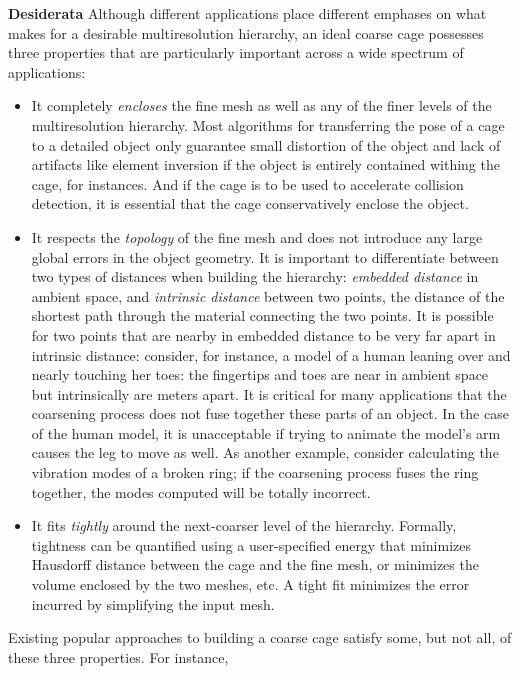 \noindent \textbf{Desiderata} Although different applications place different
emphases on what makes for a desirable multiresolution hierarchy, an ideal
coarse cage possesses three properties that are particularly important across a
wide spectrum of applications:
\begin{itemize}
\item It completely \emph{encloses} the fine mesh as well as any of the finer
levels of the multiresolution hierarchy. Most algorithms for transferring the
pose of a cage to a detailed object only guarantee small distortion of the
object and lack of artifacts like element inversion if the object is entirely
contained withing the cage, for instances. And if the cage is to be used to
accelerate collision detection, it is essential that the cage conservatively
enclose the object. 
\item It respects the \emph{topology} of the fine mesh and does not introduce
any large global errors in the object geometry. It is important to
differentiate between two types of distances when building the hierarchy:
\emph{embedded distance} in ambient space, and \emph{intrinsic distance}
between two points, the distance of the shortest path through the material
connecting the two points. It is possible for two points that are nearby in
embedded distance to be very far apart in intrinsic distance: consider, for
instance, a model of a human leaning over and nearly touching her toes: the
fingertips and toes are near in ambient space but intrinsically are meters
apart. It is critical for many applications that the coarsening process does
not fuse together these parts of an object. In the case of the human model, it
is unacceptable if trying to animate the model's arm causes the leg to move as
well. As another example, consider calculating the vibration modes of a broken
ring; if the coarsening process fuses the ring together, the modes computed
will be totally incorrect.
\item It fits \emph{tightly} around the next-coarser level of the hierarchy.
Formally, tightness can be quantified using a user-specified energy that
minimizes Hausdorff distance between the cage and the fine mesh, or minimizes
the volume enclosed by the two meshes, etc. A tight fit minimizes the error
incurred by simplifying the input mesh.
\end{itemize}
Existing popular approaches to building a coarse cage satisfy some, but not
all, of these three properties. For instance,
